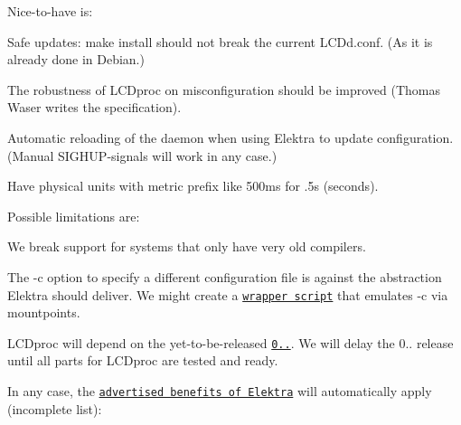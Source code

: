 Nice-\/to-\/have is\+:


\begin{DoxyItemize}
\item Safe updates\+: {\ttfamily make install} should not break the current {\ttfamily L\+C\+Dd.\+conf}. (As it is already done in Debian.)
\item The robustness of L\+C\+Dproc on misconfiguration should be improved (Thomas Waser writes the specification).
\item Automatic reloading of the daemon when using Elektra to update configuration. (Manual {\ttfamily S\+I\+G\+H\+UP}-\/signals will work in any case.)
\item Have physical units with metric prefix like {\ttfamily 500ms} for {.\+5s} (seconds).
\end{DoxyItemize}

Possible limitations are\+:


\begin{DoxyItemize}
\item We break support for systems that only have very old compilers.
\item The {\ttfamily -\/c} option to specify a different configuration file is against the abstraction Elektra should deliver. We might create a \href{https://github.com/ElektraInitiative/libelektra/issues/1416}{\tt wrapper script} that emulates {\ttfamily -\/c} via mountpoints.
\item L\+C\+Dproc will depend on the yet-\/to-\/be-\/released \href{https://github.com/ElektraInitiative/libelektra/milestone/11}{\tt 0..}. We will delay the 0.. release until all parts for L\+C\+Dproc are tested and ready.
\end{DoxyItemize}

In any case, the \href{https://www.libelektra.org}{\tt advertised benefits of Elektra} will automatically apply (incomplete list)\+:


